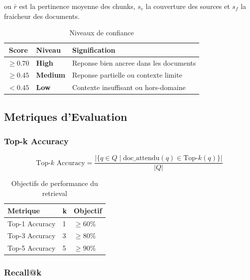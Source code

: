 \documentclass[12pt,a4paper]{article}
\begin{document}
ou $\bar{r}$ est la pertinence moyenne des chunks, $s_c$ la couverture des sources
et $s_f$ la fraicheur des documents.

\begin{table}[h]
\centering
\caption{Niveaux de confiance}
\begin{tabular}{cll}
\toprule
\textbf{Score} & \textbf{Niveau} & \textbf{Signification} \\
\midrule
$\geq 0.70$ & \textcolor{success}{\textbf{High}} & Reponse bien ancree dans les documents \\
$\geq 0.45$ & \textcolor{warning}{\textbf{Medium}} & Reponse partielle ou contexte limite \\
$< 0.45$ & \textcolor{danger}{\textbf{Low}} & Contexte insuffisant ou hors-domaine \\
\bottomrule
\end{tabular}
\end{table}

\subsection{Metriques d'Evaluation}

\subsubsection{Top-k Accuracy}

\begin{equation}
\text{Top-}k\text{ Accuracy} =
\frac{\bigl|\{q \in Q \mid \text{doc\_attendu}(q) \in \text{Top-}k(q)\}\bigr|}{|Q|}
\label{eq:topk}
\end{equation}

\begin{table}[h]
\centering
\caption{Objectifs de performance du retrieval}
\begin{tabular}{lll}
\toprule
\textbf{Metrique} & \textbf{k} & \textbf{Objectif} \\
\midrule
Top-1 Accuracy & 1 & $\geq 60\%$ \\
Top-3 Accuracy & 3 & $\geq 80\%$ \\
Top-5 Accuracy & 5 & $\geq 90\%$ \\
\bottomrule
\end{tabular}
\end{table}

\subsubsection{Recall@k}
\end{document}

